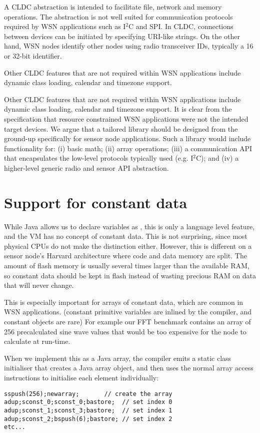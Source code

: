 A CLDC  abstraction is intended to facilitate file, network and memory operations. The abstraction is not well suited for communication protocols required by WSN applications such as I$^{2}$C and SPI. In CLDC, connections between devices can be initiated by specifying URI-like strings. On the other hand, WSN nodes identify other nodes using radio transceiver IDs, typically a 16 or 32-bit identifier.

Other CLDC features that are not required within WSN applications include dynamic class loading, calendar and timezone support.

Other CLDC features that are not required within WSN applications include dynamic class loading, calendar and timezone support. It is clear from the specification that resource constrained WSN applications were not the intended target devices. We argue that a tailored library should be designed from the ground-up specifically for sensor node applications. Such a library would include functionality for: (i) basic math; (ii) array operations; (iii) a communication API that encapsulates the low-level protocols typically used (e.g. I$^{2}$C); and (iv) a higher-level generic radio and sensor API abstraction.

\section{Support for constant data}
\label{sec-const-data}
While Java allows us to declare variables as , this is only a language level feature, and the VM has no concept of constant data. This is not surprising, since most physical CPUs do not make the distinction either. However, this is different on a sensor node's Harvard architecture where code and data memory are split. The amount of flash memory is usually several times larger than the available RAM, so constant data should be kept in flash instead of wasting precious RAM on data that will never change.

This is especially important for arrays of constant data, which are common in WSN applications. (constant primitive variables are inlined by the compiler, and constant objects are rare) For example our FFT benchmark contains an array of 256 precalculated sine wave values that would be too expensive for the node to calculate at run-time.

When we implement this as a  Java array, the compiler emits a static class initialiser that creates a Java array object, and then uses the normal array access instructions to initialise each element individually:
\begin{verbatim}
sspush(256);newarray;       // create the array
adup;sconst_0;sconst_0;bastore;  // set index 0
adup;sconst_1;sconst_3;bastore;  // set index 1
adup;sconst_2;bspush(6);bastore; // set index 2
etc...
\end{verbatim}


